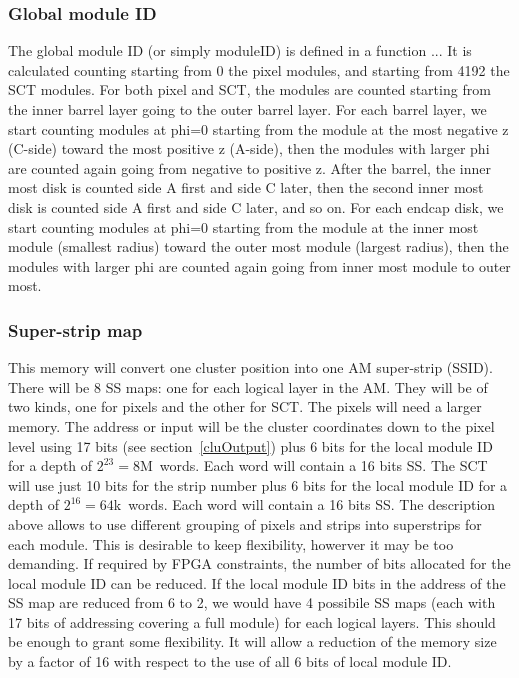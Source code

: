 \documentclass[10pt]{article}
\numberwithin{figure}{section}
\numberwithin{equation}{section}
\numberwithin{table}{section}
\newcommand{\0}{\phantom{0}}
\begin{document}
\subsubsection{Global module ID}
The global module ID (or simply moduleID) is defined in a function ...
It is calculated counting starting from 0 the pixel modules, and starting from 4192 the SCT modules.
For both pixel and SCT, the modules are counted starting from the inner barrel layer going to the outer barrel layer.
For each barrel layer, we start counting modules at phi=0 starting from the module at the most negative z (C-side) toward the most positive z (A-side), then the modules with larger phi are counted again going from negative to positive z.
After the barrel, the inner most disk is counted side A first and side C later, then the second inner most disk is counted side A first and side C later, and so on.
For each endcap disk, we start counting modules at phi=0 starting from the module at the inner most module (smallest radius) toward the outer most module (largest radius), then the modules with larger phi are counted again going from inner most module to outer most.

\subsubsection{Super-strip map}
\label{sec:ssmap}
This memory will convert one cluster position into one AM super-strip (SSID). There will be 8 SS maps: one for each logical layer in the AM.
They will be of two kinds, one for pixels and the other for SCT.
The pixels will need a larger memory. The address or input will be the cluster coordinates down to the pixel level using 17 bits (see section~\ref{cluOutput}) plus 6 bits for the local module ID for a depth of $2^{23}=8$M~words. Each word will contain a 16 bits SS.
The SCT will use just 10 bits for the strip number plus 6 bits for the local module ID for a depth of $2^{16}=64$k~words. Each word will contain a 16 bits SS.
The description above allows to use different grouping of pixels and strips into superstrips for each module.
This is desirable to keep flexibility, howerver it may be too demanding.
If required by FPGA constraints, the number of bits allocated for the local module ID can be reduced.
If the local module ID bits in the address of the SS map are reduced from 6 to 2, we would have 4 possibile SS maps (each with 17 bits of addressing covering a full module) for each logical layers.
This should be enough to grant some flexibility. It will allow a reduction of the memory size by a factor of 16 with respect to the use of all 6 bits of local module ID.
\end{document}
